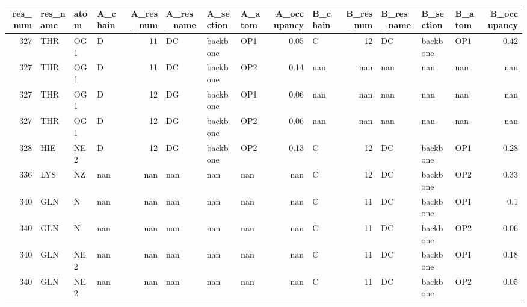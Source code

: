 \begin{longtable}{rlllrlllrlrlllr}
\hline
   res\_num & res\_name   & atom   & A\_chain   &   A\_res\_num & A\_res\_name   & A\_section   & A\_atom   &   A\_occupancy & B\_chain   &   B\_res\_num & B\_res\_name   & B\_section   & B\_atom   &   B\_occupancy \\
\hline
\endhead
       327 & THR        & OG1    & D         &          11 & DC           & backbone    & OP1      &          0.05 & C         &          12 & DC           & backbone    & OP1      &          0.42 \\
       327 & THR        & OG1    & D         &          11 & DC           & backbone    & OP2      &          0.14 & nan       &         nan & nan          & nan         & nan      &        nan    \\
       327 & THR        & OG1    & D         &          12 & DG           & backbone    & OP1      &          0.06 & nan       &         nan & nan          & nan         & nan      &        nan    \\
       327 & THR        & OG1    & D         &          12 & DG           & backbone    & OP2      &          0.06 & nan       &         nan & nan          & nan         & nan      &        nan    \\
       328 & HIE        & NE2    & D         &          12 & DG           & backbone    & OP2      &          0.13 & C         &          12 & DC           & backbone    & OP1      &          0.28 \\
       336 & LYS        & NZ     & nan       &         nan & nan          & nan         & nan      &        nan    & C         &          12 & DC           & backbone    & OP2      &          0.33 \\
       340 & GLN        & N      & nan       &         nan & nan          & nan         & nan      &        nan    & C         &          11 & DC           & backbone    & OP1      &          0.1  \\
       340 & GLN        & N      & nan       &         nan & nan          & nan         & nan      &        nan    & C         &          11 & DC           & backbone    & OP2      &          0.06 \\
       340 & GLN        & NE2    & nan       &         nan & nan          & nan         & nan      &        nan    & C         &          11 & DC           & backbone    & OP1      &          0.18 \\
       340 & GLN        & NE2    & nan       &         nan & nan          & nan         & nan      &        nan    & C         &          11 & DC           & backbone    & OP2      &          0.05 \\

\end{longtable}
